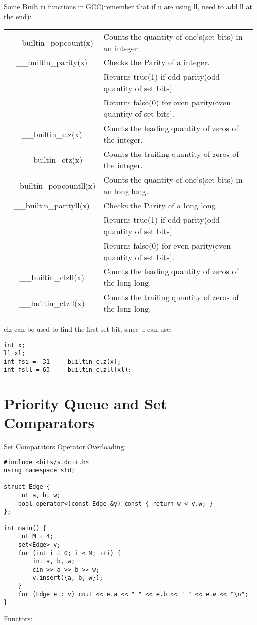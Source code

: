 Some Built in functions in GCC(remember that if u are using ll, need to add ll at the end):
\begin{center}
\begin{tabular}{ c | l }
  \_\_builtin\_popcount(x)  & Counts the quantity of one’s(set bits) in an integer.  \\ 
 \_\_builtin\_parity(x) & Checks the Parity of a integer.\\
 
 &Returns true(1) if odd parity(odd quantity of set bits)\\
 
 & Returns false(0) for even parity(even quantity of set bits).  \\  
 \_\_builtin\_clz(x) &  Counts the leading quantity of zeros of the integer.\\
 \_\_builtin\_ctz(x) & Counts the trailing quantity of zeros of the integer.  \\ 
 \_\_builtin\_popcountll(x)  & Counts the quantity of one’s(set bits) in an long long.  \\ 
 \_\_builtin\_parityll(x) & Checks the Parity of a long long.\\
 
 &Returns true(1) if odd parity(odd quantity of set bits)\\
 
 & Returns false(0) for even parity(even quantity of set bits).  \\   
 \_\_builtin\_clzll(x) &  Counts the leading quantity of zeros of the long long.\\
 \_\_builtin\_ctzll(x) & Counts the trailing quantity of zeros of the long long.  \\ 
\end{tabular}
\end{center}
clz can be used to find the first set bit, since u can use:
\begin{lstlisting}
int x;
ll xl;
int fsi =  31 - __builtin_clz(x);
int fsll = 63 - __builtin_clzll(xl);
\end{lstlisting}
\section{Priority Queue and Set Comparators}

Set Comparators
Operator Overloading:
\begin{lstlisting}
#include <bits/stdc++.h>
using namespace std;

struct Edge {
	int a, b, w;
	bool operator<(const Edge &y) const { return w < y.w; }
};

int main() {
	int M = 4;
	set<Edge> v;
	for (int i = 0; i < M; ++i) {
		int a, b, w;
		cin >> a >> b >> w;
		v.insert({a, b, w});
	}
	for (Edge e : v) cout << e.a << " " << e.b << " " << e.w << "\n";
}
\end{lstlisting}
Functors:

